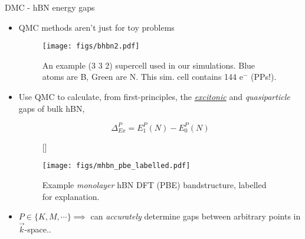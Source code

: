 \documentclass[hyperref={draft}]{beamer}
\newcommand{\red}[1]{{\bf\color{red}{#1}}}
\newcommand{\ket}[1]{\lvert {#1} \rangle}
\begin{document}
\begin{frame}[fragile]
\begin{columns}[T]
\begin{column}{.46\textwidth}


\begin{block}{DMC - hBN energy gaps}
\begin{itemize}
\item QMC methods aren't just for toy problems
\begin{figure}[H]

	\centering
	\texttt{[image: figs/bhbn2.pdf]}
	\caption{An example (3 3 2) supercell used in our simulations. Blue atoms are B, Green are N. This sim. cell contains 144 e$^-$ (PPs!).}
	\label{bhbn_332}

\end{figure}

\item \red{Goal:} Use QMC to calculate, from first-principles, the {\it\underline{excitonic}} and {\it quasiparticle} gaps of bulk hBN,

\begin{equation}
	\Delta^P_{Ex} = E^P_1(N) - E^P_0(N)
\end{equation}

\begin{figure}[H]
	[\FBwidth]
	{\caption{Example {\it monolayer} hBN DFT (PBE) bandstructure, labelled for explanation.}\label{fig:mhbn_pbe_labelled}}
	{\texttt{[image: figs/mhbn\_pbe\_labelled.pdf]}}
\end{figure}
\item \red{Why?} $P \in \{ {K,M, \cdots} \} \implies$ can {\it accurately} determine gaps between arbitrary points in $\vec k$-space..


\end{itemize}
\end{block}
\end{column}
\end{columns}
\end{frame}
\end{document}
